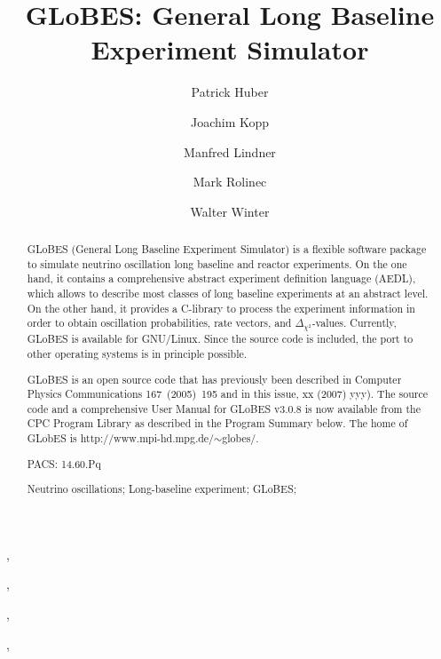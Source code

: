 \documentclass{elsart}
\newcounter{bla}
\begin{document}
\begin{frontmatter}

\title{GLoBES: General Long Baseline Experiment Simulator}

\author[a]{Patrick Huber},
\author[b]{Joachim Kopp},
\author[b]{Manfred Lindner},
\author[c]{Mark Rolinec},
\author[d]{Walter Winter}

\address[a]{University of Wisconsin, Physics Department, 1150 University Av. Madison, WI 53706, USA}
\address[b]{Max-Planck-Institut f\"{u}r Kernphysik, Postfach 10 39 80, D-69029 Heidelberg, Germany}
\address[c]{Technische Universit\"{a}t M\"{u}nchen, Institut f\"{u}r
Theoretische Physik, Physik-Department, James-Franck-Strasse,
D-85748 Garching, Germany}
\address[d]{Universit\"{a}t W\"{u}rzburg, Lehrstuhl f\"{u}r theoretische Physik II, Institut f\"{u}r theoretische Physik und Astrophysik, Am Hubland, D-97074 W\"{u}rzburg, Germany}

\begin{abstract}
GLoBES (General Long Baseline Experiment Simulator) is a flexible software package to simulate
neutrino oscillation long baseline and reactor experiments. On the one hand, it contains a
comprehensive abstract experiment definition language (AEDL), which allows to describe most classes of
long baseline experiments at an abstract level. On the other hand, it provides a C-library to process
the experiment information in order to obtain oscillation probabilities, rate vectors, and
$\Delta_{\chi^{2}}$-values. Currently, GLoBES is available for GNU/Linux. Since the source code is
included, the port to other operating systems is in principle possible.

GLoBES is an open source code that has previously been described in Computer Physics Communications
167~(2005)~195 and in this issue, xx (2007) yyy). The source code and a comprehensive User Manual for
GLoBES v3.0.8 is now available from the CPC Program Library as described in the Program Summary below.
The home of GLobES is http://www.mpi-hd.mpg.de/$\sim$globes/.

\begin{flushleft}

PACS: 14.60.Pq

\end{flushleft}

\begin{keyword}
Neutrino oscillations; Long-baseline experiment; GLoBES;
\end{keyword}

\end{abstract}


\end{frontmatter}
\end{document}
